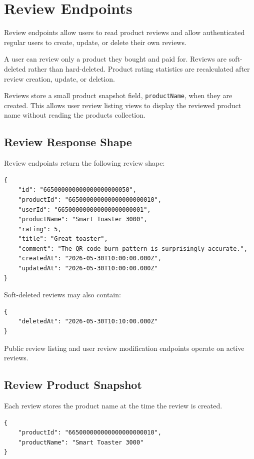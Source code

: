 \section{Review Endpoints}

Review endpoints allow users to read product reviews and allow authenticated regular users to create, update, or delete their own reviews.

A user can review only a product they bought and paid for. Reviews are soft-deleted rather than hard-deleted. Product rating statistics are recalculated after review creation, update, or deletion.

Reviews store a small product snapshot field, \texttt{productName}, when they are created. This allows user review listing views to display the reviewed product name without reading the products collection.

\subsection{Review Response Shape}

Review endpoints return the following review shape:

\begin{verbatim}
{
    "id": "665000000000000000000050",
    "productId": "665000000000000000000010",
    "userId": "665000000000000000000001",
    "productName": "Smart Toaster 3000",
    "rating": 5,
    "title": "Great toaster",
    "comment": "The QR code burn pattern is surprisingly accurate.",
    "createdAt": "2026-05-30T10:00:00.000Z",
    "updatedAt": "2026-05-30T10:00:00.000Z"
}
\end{verbatim}

Soft-deleted reviews may also contain:

\begin{verbatim}
{
    "deletedAt": "2026-05-30T10:10:00.000Z"
}
\end{verbatim}

Public review listing and user review modification endpoints operate on active reviews.

\subsection{Review Product Snapshot}

Each review stores the product name at the time the review is created.

\begin{verbatim}
{
    "productId": "665000000000000000000010",
    "productName": "Smart Toaster 3000"
}
\end{verbatim}

